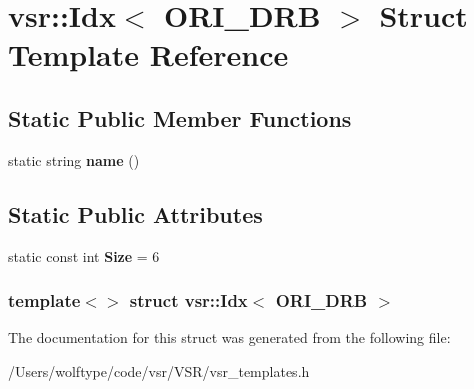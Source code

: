 \hypertarget{structvsr_1_1_idx_3_01_o_r_i___d_r_b_01_4}{\section{vsr\-:\-:Idx$<$ O\-R\-I\-\_\-\-D\-R\-B $>$ Struct Template Reference}
\label{structvsr_1_1_idx_3_01_o_r_i___d_r_b_01_4}
}
\subsection*{Static Public Member Functions}
\begin{DoxyCompactItemize}
\item 
\hypertarget{structvsr_1_1_idx_3_01_o_r_i___d_r_b_01_4_a34076f62d766b43e9d993202e346636a}{static string {\bfseries name} ()}\label{structvsr_1_1_idx_3_01_o_r_i___d_r_b_01_4_a34076f62d766b43e9d993202e346636a}

\end{DoxyCompactItemize}
\subsection*{Static Public Attributes}
\begin{DoxyCompactItemize}
\item 
\hypertarget{structvsr_1_1_idx_3_01_o_r_i___d_r_b_01_4_a7548f19995b74eb60c55aad150e37797}{static const int {\bfseries Size} = 6}\label{structvsr_1_1_idx_3_01_o_r_i___d_r_b_01_4_a7548f19995b74eb60c55aad150e37797}

\end{DoxyCompactItemize}
\subsubsection*{template$<$$>$ struct vsr\-::\-Idx$<$ O\-R\-I\-\_\-\-D\-R\-B $>$}



The documentation for this struct was generated from the following file\-:\begin{DoxyCompactItemize}
\item 
/\-Users/wolftype/code/vsr/\-V\-S\-R/vsr\-\_\-templates.\-h\end{DoxyCompactItemize}
